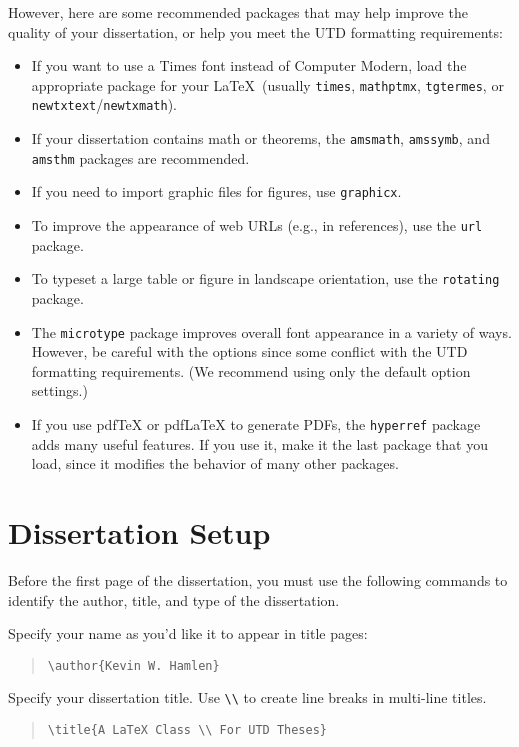 \documentclass[doublespacing]{utdthesis}
\newenvironment{exampleclasscode}
 {\parindent=1cm\begin{verse}}
 {\end{verse}}
\begin{document}
However, here are some recommended packages that may help improve the quality
of your dissertation, or help you meet the UTD formatting requirements:
\begin{itemize}
\item If you want to use a Times font instead of Computer Modern, load the
 appropriate package for your \LaTeX\ (usually
 \texttt{times}, \texttt{mathptmx}, \texttt{tgtermes}, or
 \texttt{newtxtext}/\texttt{newtxmath}).
\item If your dissertation contains math or theorems, the \texttt{amsmath},
 \texttt{amssymb}, and \texttt{amsthm} packages are recommended.
\item If you need to import graphic files for figures, use \texttt{graphicx}.
\item To improve the appearance of web URLs (e.g., in references), use the
 \texttt{url} package.
\item To typeset a large table or figure in landscape orientation, use the
 \texttt{rotating} package.
\item The \texttt{microtype} package improves overall font appearance in a
 variety of ways.
 However, be careful with the options since some conflict with the UTD
 formatting requirements.
 (We recommend using only the default option settings.)
\item If you use pdf\TeX{} or pdf\LaTeX{} to generate PDFs, the
 \texttt{hyperref} package adds many useful features.
 If you use it, make it the last package that you load, since it modifies the
 behavior of many other packages.
\end{itemize}

\section{Dissertation Setup}
\label{s:setup}

Before the first page of the dissertation, you must use the following commands
to identify the author, title, and type of the dissertation.

Specify your name as you'd like it to appear in title pages:
\begin{exampleclasscode}
\verb|\author{Kevin W. Hamlen}|
\end{exampleclasscode}

Specify your dissertation title.
Use \verb|\\| to create line breaks in multi-line titles.
\begin{exampleclasscode}
\verb|\title{A LaTeX Class \\ For UTD Theses}|
\end{exampleclasscode}
\end{document}
